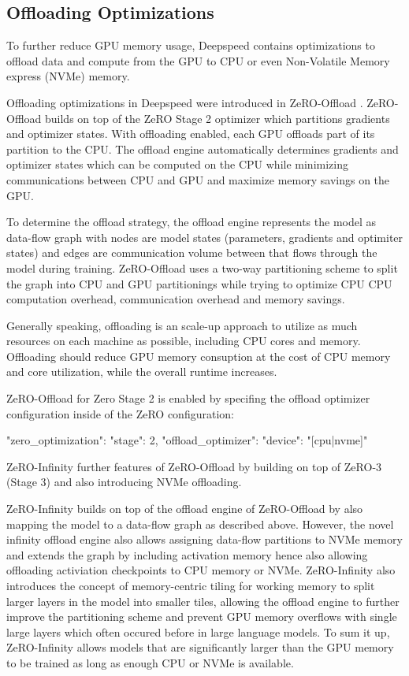 \subsection{Offloading Optimizations}

To further reduce GPU memory usage, Deepspeed contains optimizations to offload 
data and compute from the GPU to CPU or even Non-Volatile Memory express (NVMe) 
memory. 

Offloading optimizations in Deepspeed were introduced in ZeRO-Offload 
\cite*{DBLP:journals/corr/abs-2101-06840}. ZeRO-Offload builds on top of 
the ZeRO Stage 2 optimizer which partitions gradients and optimizer states. 
With offloading enabled, each GPU offloads part of its partition to the CPU. 
The offload engine automatically determines gradients and optimizer states 
which can be computed on the CPU while minimizing communications between CPU 
and GPU and maximize memory savings on the GPU.

To determine the offload strategy, the offload engine represents the model as 
data-flow graph with nodes are model states (parameters, gradients and 
optimiter states) and edges are communication volume between that flows through 
the model during training. ZeRO-Offload uses a two-way partitioning scheme to 
split the graph into CPU and GPU partitionings while trying to optimize CPU 
CPU computation overhead, communication overhead and memory savings. 

Generally speaking, offloading is an scale-up approach to utilize as much 
resources on each machine as possible, including CPU cores and memory. 
Offloading should reduce GPU memory consuption at the cost of CPU memory and 
core utilization, while the overall runtime increases.

ZeRO-Offload for Zero Stage 2 is enabled by specifing the offload optimizer 
configuration inside of the ZeRO configuration:

\begin{json}
{
    "zero_optimization": {
        "stage": 2,
        "offload_optimizer": {
            "device": "[cpu|nvme]"
        }
    }
}
\end{json}

ZeRO-Infinity \cite*{DBLP:journals/corr/abs-2104-07857} further features of 
ZeRO-Offload by building on top of ZeRO-3 (Stage 3) and also introducing NVMe 
offloading.

ZeRO-Infinity builds on top of the offload engine of ZeRO-Offload by also 
mapping the model to a data-flow graph as described above. However, the 
novel infinity offload engine also allows assigning data-flow partitions 
to NVMe memory and extends the graph by including activation memory hence 
also allowing offloading activiation checkpoints to CPU memory or NVMe. 
ZeRO-Infinity also introduces the concept of memory-centric tiling for 
working memory to split larger layers in the model into smaller tiles, 
allowing the offload engine to further improve the partitioning scheme and 
prevent GPU memory overflows with single large layers which often occured 
before in large language models.   To sum it up, ZeRO-Infinity allows 
models that are significantly larger than the GPU memory to be trained as 
long as enough CPU or NVMe is available. 

